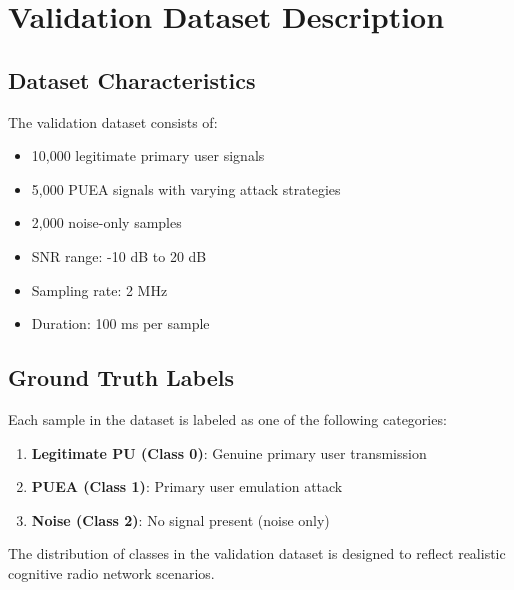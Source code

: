 \chapter{Validation Dataset Description}
\label{app:validation}

\section{Dataset Characteristics}
\label{app:dataset_chars}

The validation dataset consists of:
\begin{itemize}
    \item 10,000 legitimate primary user signals
    \item 5,000 PUEA signals with varying attack strategies
    \item 2,000 noise-only samples
    \item SNR range: -10 dB to 20 dB
    \item Sampling rate: 2 MHz
    \item Duration: 100 ms per sample
\end{itemize}

\section{Ground Truth Labels}
\label{app:ground_truth}

Each sample in the dataset is labeled as one of the following categories:
\begin{enumerate}
    \item \textbf{Legitimate PU (Class 0)}: Genuine primary user transmission
    \item \textbf{PUEA (Class 1)}: Primary user emulation attack
    \item \textbf{Noise (Class 2)}: No signal present (noise only)
\end{enumerate}

The distribution of classes in the validation dataset is designed to reflect realistic cognitive radio network scenarios.
